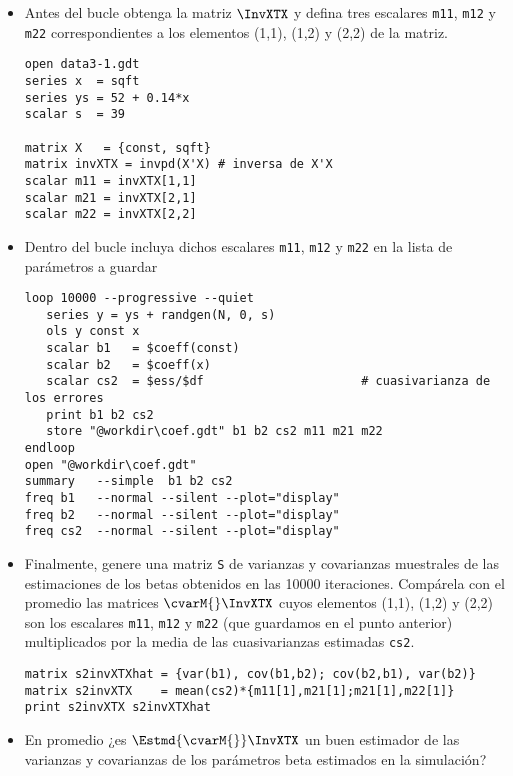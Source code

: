 \documentclass[11pt]{article}
\begin{document}
\begin{itemize}
\item Antes del bucle obtenga la matriz \(\InvXTX\) y defina tres escalares
\texttt{m11}, \texttt{m12} y \texttt{m22} correspondientes a los elementos (1,1), (1,2) y
(2,2) de la matriz.
\begin{verbatim}
open data3-1.gdt
series x  = sqft
series ys = 52 + 0.14*x
scalar s  = 39

matrix X   = {const, sqft}
matrix invXTX = invpd(X'X) # inversa de X'X
scalar m11 = invXTX[1,1]
scalar m21 = invXTX[2,1]
scalar m22 = invXTX[2,2]
\end{verbatim}

\item Dentro del bucle incluya dichos escalares \texttt{m11}, \texttt{m12} y \texttt{m22} en la
lista de parámetros a guardar

\begin{verbatim}
loop 10000 --progressive --quiet
   series y = ys + randgen(N, 0, s)
   ols y const x
   scalar b1   = $coeff(const)
   scalar b2   = $coeff(x)
   scalar cs2  = $ess/$df                      # cuasivarianza de los errores
   print b1 b2 cs2
   store "@workdir\coef.gdt" b1 b2 cs2 m11 m21 m22    
endloop
open "@workdir\coef.gdt"
summary   --simple  b1 b2 cs2
freq b1   --normal --silent --plot="display"
freq b2   --normal --silent --plot="display"
freq cs2  --normal --silent --plot="display"
\end{verbatim}

\item Finalmente, genere una matriz \texttt{S} de varianzas y covarianzas
muestrales de las estimaciones de los betas obtenidos en las 10000
iteraciones. Compárela con el promedio las matrices
\(\cvarM{}\InvXTX\) cuyos elementos (1,1), (1,2) y (2,2) son los
escalares \texttt{m11}, \texttt{m12} y \texttt{m22} (que guardamos en el punto anterior)
multiplicados por la media de las cuasivarianzas estimadas \texttt{cs2}.
\begin{verbatim}
matrix s2invXTXhat = {var(b1), cov(b1,b2); cov(b2,b1), var(b2)}
matrix s2invXTX    = mean(cs2)*{m11[1],m21[1];m21[1],m22[1]}
print s2invXTX s2invXTXhat
\end{verbatim}

\item En promedio ¿es \(\Estmd{\cvarM{}}\InvXTX\) un buen estimador de las
varianzas y covarianzas de los parámetros beta estimados en la
simulación?
\end{itemize}

\clearpage
\vspace{10pt}
\noindent
\end{document}
